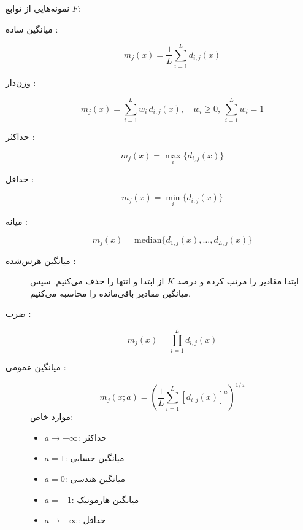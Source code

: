 \documentclass[12pt]{article}
\begin{document}
	نمونه‌هایی از توابع \(F\):
	
	\begin{description}
		\item[میانگین ساده :]
		\[
		m_j(x) = \frac{1}{L} \sum_{i=1}^{L} d_{i,j}(x)
		\]
		
		\item[وزن‌دار :]
		\[
		m_j(x) = \sum_{i=1}^{L} w_i\,d_{i,j}(x), \quad w_i \ge 0,\ \sum_{i=1}^{L} w_i = 1
		\]
		
		\item[حداکثر :]
		\[
		m_j(x) = \max_{i} \{ d_{i,j}(x) \}
		\]
		
		\item[حداقل :]
		\[
		m_j(x) = \min_{i} \{ d_{i,j}(x) \}
		\]
		
		\item[میانه :]
		\[
		m_j(x) = \mathrm{median} \bigl\{ d_{1,j}(x), \dots, d_{L,j}(x) \bigr\}
		\]
		
		\item[میانگین هرس‌شده :] ابتدا مقادیر را مرتب کرده و درصد \(K\) از ابتدا و انتها را حذف می‌کنیم. سپس میانگین مقادیر باقی‌مانده را محاسبه می‌کنیم.
		
		\item[ضرب :]
		\[
		m_j(x) = \prod_{i=1}^{L} d_{i,j}(x)
		\]
		
		\item[میانگین عمومی :]
		\[
		m_j(x; a) = \left( \frac{1}{L} \sum_{i=1}^{L} [d_{i,j}(x)]^a \right)^{1/a}
		\]
		موارد خاص:
		\begin{itemize}
			\item \(a \to +\infty\): حداکثر 
			\item \(a = 1\): میانگین حسابی 
			\item \(a = 0\): میانگین هندسی 
			\item \(a = -1\): میانگین هارمونیک 
			\item \(a \to -\infty\): حداقل 
		\end{itemize}
	\end{description}
	
\end{document}
